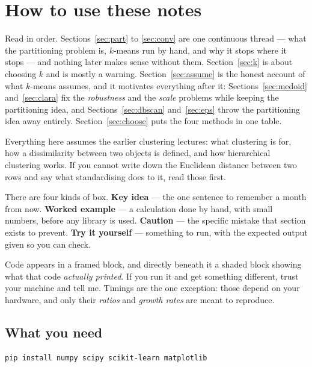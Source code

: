 \documentclass[11pt]{article}
\begin{document}
\tableofcontents
\medskip

\section{How to use these notes}
\label{sec:how}

Read in order. Sections~\ref{sec:part} to \ref{sec:conv} are one continuous
thread --- what the partitioning problem is, $k$-means run by hand, and why
it stops where it stops --- and nothing later makes sense without them.
Section~\ref{sec:k} is about choosing $k$ and is mostly a warning.
Section~\ref{sec:assume} is the honest account of what $k$-means assumes, and
it motivates everything after it: Sections~\ref{sec:medoid}
and~\ref{sec:clara} fix the \emph{robustness} and the \emph{scale} problems
while keeping the partitioning idea, and Sections~\ref{sec:dbscan}
and~\ref{sec:eps} throw the partitioning idea away entirely.
Section~\ref{sec:choose} puts the four methods in one table.

Everything here assumes the earlier clustering lectures: what clustering is
for, how a dissimilarity between two objects is defined, and how hierarchical
clustering works. If you cannot write down the Euclidean distance between two
rows and say what standardising does to it, read those first.

There are four kinds of box. \textbf{Key idea} --- the one sentence to
remember a month from now. \textbf{Worked example} --- a calculation done by
hand, with small numbers, before any library is used. \textbf{Caution} --- the
specific mistake that section exists to prevent. \textbf{Try it yourself} ---
something to run, with the expected output given so you can check.

Code appears in a framed block, and directly beneath it a shaded block showing
what that code \emph{actually printed}. If you run it and get something
different, trust your machine and tell me. Timings are the one exception:
those depend on your hardware, and only their \emph{ratios} and \emph{growth
rates} are meant to reproduce.

\subsection{What you need}

\begin{lstlisting}
pip install numpy scipy scikit-learn matplotlib
\end{lstlisting}
\end{document}
